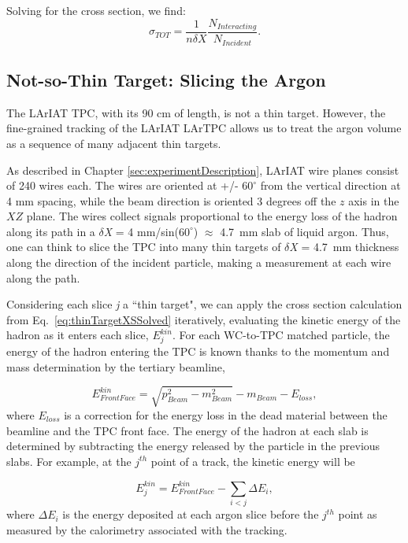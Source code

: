 Solving for the cross section, we find:
\begin{equation}
 \sigma_{TOT}  = \frac{1}{n \delta X}\frac{N_{Interacting}}{N_{Incident}}.
\label{eq:thinTargetXSSolved}
\end{equation}

\subsection{Not-so-Thin Target: Slicing the Argon}
The LArIAT TPC, with its 90 cm of length, is not a thin target. However, the fine-grained tracking of the LArIAT LArTPC allows us to treat the argon volume as a sequence of many adjacent thin targets. 

As described in Chapter \ref{sec:experimentDescription}, LArIAT wire planes consist of 240 wires each. The wires are oriented at +/- $60^{\circ}$ from the vertical direction at 4 mm spacing, while the beam direction is oriented 3 degrees off the $z$ axis in the $XZ$ plane.  The wires collect signals proportional to the energy loss of the hadron along its path in a  $\delta${\emph{X}} = 4 mm/sin($60^{\circ}$) $\approx$ 4.7~mm slab of liquid argon. Thus, one can think to slice the TPC into many thin targets of $\delta${\emph{X}} = 4.7~mm thickness along the direction of the incident particle, making a measurement at each wire along the path.

Considering each slice {\emph{j}}  a ``thin target",  we can apply the cross section calculation from Eq.~\ref{eq:thinTargetXSSolved} iteratively, evaluating the kinetic energy of the hadron as it enters each slice, $E_{j}^{kin}$.  For each WC-to-TPC matched particle, the energy of the hadron entering the TPC is known thanks to the momentum and mass determination by the tertiary beamline, 

\begin{equation}
 E^{kin}_{Front Face}  = \sqrt{p^2_{Beam} - m^2_{Beam}} - m_{Beam} - E_{loss},
\label{eq:enFF}
\end{equation}
where $E_{loss}$ is a correction for the energy loss in the dead material between the beamline and the TPC front face. The  energy of the hadron at each slab is determined by subtracting the energy released by the particle in the previous slabs. For example, at the $j^{th}$ point of a track, the kinetic energy will be

\begin{equation}
 E_{j}^{kin} =  E^{kin}_{Front Face} - \sum_{i < j} \Delta E_i,
\label{eq:KEj}
\end{equation}
where $\Delta E_i$ is the energy deposited at each argon slice before the $j^{th}$ point as measured by the calorimetry associated with the tracking.


